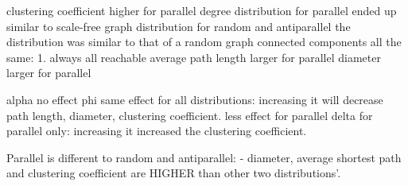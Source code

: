 clustering coefficient
	higher for parallel
degree distribution
	for parallel ended up similar to scale-free graph distribution
	for random and antiparallel the distribution was similar to that of a random graph
connected components
	all the same: 1. always all reachable
average path length
	larger for parallel
diameter
	larger for parallel


alpha
	no effect
phi
	same effect for all distributions: increasing it will decrease path length, diameter, clustering coefficient. less effect for parallel
delta
	for parallel only: increasing it increased the clustering coefficient.

Parallel is different to random and antiparallel: 
- diameter, average shortest path and clustering coefficient are HIGHER than other two distributions'.
